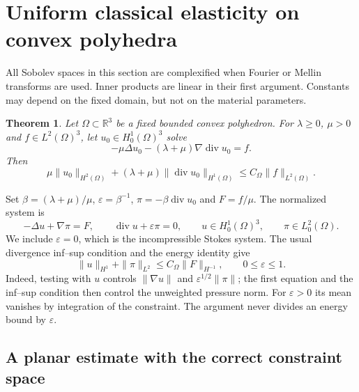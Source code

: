 \documentclass[11pt,a4paper]{article}
\newtheorem{theorem}{Theorem}[section]
\theoremstyle{remark}
\numberwithin{equation}{section}
\begin{document}
\section{Uniform classical elasticity on convex polyhedra}
\label{sec:est-classical}

All Sobolev spaces in this section are complexified when Fourier or Mellin
transforms are used. Inner products are linear in their first argument.
Constants may depend on the fixed domain, but not on the material parameters.

\begin{theorem}\label{thm:est-classical}
Let $\Omega\subset\mathbb R^3$ be a fixed bounded convex polyhedron.
For $\lambda\ge0$, $\mu>0$ and $f\in L^2(\Omega)^3$, let
$u_0\in H_0^1(\Omega)^3$ solve
\[
 -\mu\Delta u_0-(\lambda+\mu)\nabla\operatorname{div}u_0=f.
\]
Then
\begin{equation}\label{eq:est-classical}
 \mu\|u_0\|_{H^2(\Omega)}
 +(\lambda+\mu)\|\operatorname{div}u_0\|_{H^1(\Omega)}
 \le C_\Omega\|f\|_{L^2(\Omega)}.
\end{equation}
\end{theorem}

Set $\beta=(\lambda+\mu)/\mu$, $\varepsilon=\beta^{-1}$,
$\pi=-\beta\operatorname{div}u_0$ and $F=f/\mu$. The normalized system is
\begin{equation}\label{eq:est-classical-mixed}
 -\Delta u+\nabla\pi=F,
 \qquad \operatorname{div}u+\varepsilon\pi=0,
 \qquad u\in H_0^1(\Omega)^3,
 \qquad \pi\in L_0^2(\Omega).
\end{equation}
We include $\varepsilon=0$, which is the incompressible Stokes system.
The usual divergence inf--sup condition and the energy identity give
\begin{equation}\label{eq:est-classical-energy}
 \|u\|_{H^1}+\|\pi\|_{L^2}
 \le C_\Omega\|F\|_{H^{-1}},\qquad 0\le\varepsilon\le1.
\end{equation}
Indeed, testing with $u$ controls $\|\nabla u\|$ and
$\varepsilon^{1/2}\|\pi\|$; the first equation and the inf--sup condition
then control the unweighted pressure norm. For $\varepsilon>0$ its mean
vanishes by integration of the constraint. The argument never divides an
energy bound by $\varepsilon$.

\subsection{A planar estimate with the correct constraint space}
\end{document}
